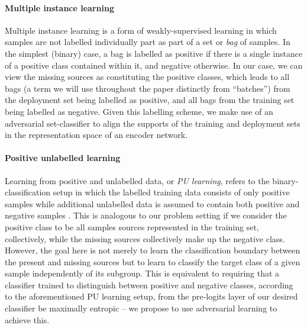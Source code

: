 \paragraph{Multiple instance learning}
%
Multiple instance learning \citep{maron1998framework} is a form of weakly-supervised learning in
which samples are not labelled individually part as part of a set or \emph{bag} of samples.
%
In the simplest (binary) case, a bag is labelled as positive if there is a single instance of a
positive class contained within it, and negative otherwise.
%
In our case, we can view the missing sources as constituting the positive classes, which leads to
all bags (a term we will use throughout the paper distinctly from ``batches'') from the deployment
set being labelled as positive, and all bags from the training set being labelled as negative.
%
Given this labelling scheme, we make use of an adversarial set-classifier to align the supports of
the training and deployment sets in the representation space of an encoder network.
%

\paragraph{Positive unlabelled learning}
%
Learning from positive and unlabelled data, or \emph{PU learning}, refers to the
binary-classification setup in which the labelled training data consists of only positive samples
while additional unlabelled data is assumed to contain both positive and negative samples
\citep{liu2002partially, liu2003building, bekker2020learning}. 
%
This is analogous to our problem setting if we consider the positive class to be all samples
sources represented in the training set, collectively, while the missing sources collectively make
up the negative class. 
%
However, the goal here is not merely to learn the classification boundary between the present and
missing sources but to learn to classify the target class of a given sample independently of its
subgroup.
%
This is equivalent to requiring that a classifier trained to distinguish between positive and
negative classes, according to the aforementioned PU learning setup, from the pre-logits layer of
our desired classifier be maximally entropic -- we propose to use adversarial learning to achieve
this.
%
